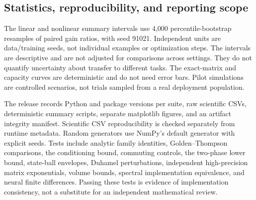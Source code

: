 \subsection{Statistics, reproducibility, and reporting scope}
The linear and nonlinear summary intervals use 4,000 percentile-bootstrap resamples of paired gain ratios, with seed 91021. Independent units are data/training seeds, not individual examples or optimization steps. The intervals are descriptive and are not adjusted for comparisons across settings. They do not quantify uncertainty about transfer to different tasks. The exact-matrix and capacity curves are deterministic and do not need error bars. Pilot simulations are controlled scenarios, not trials sampled from a real deployment population.

The release records Python and package versions per suite, raw scientific CSVs, deterministic summary scripts, separate matplotlib figures, and an artifact integrity manifest. Scientific CSV reproducibility is checked separately from runtime metadata. Random generators use NumPy's default generator with explicit seeds. Tests include analytic family identities, Golden--Thompson comparisons, the conditioning bound, commuting controls, the two-phase lower bound, state-ball envelopes, Duhamel perturbations, independent high-precision matrix exponentials, volume bounds, spectral implementation equivalence, and neural finite differences. Passing these tests is evidence of implementation consistency, not a substitute for an independent mathematical review.

